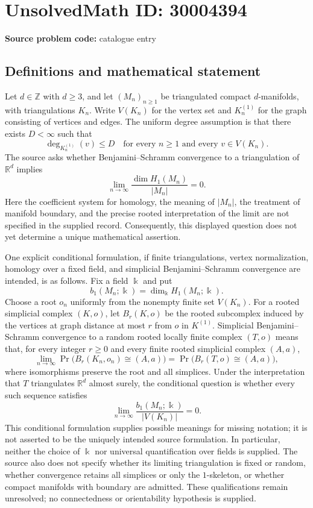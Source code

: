 \documentclass[11pt]{article}
\newcommand{\Z}{\mathbb{Z}}
\newcommand{\R}{\mathbb{R}}
\begin{document}
\section*{UnsolvedMath ID: 30004394}
\textbf{Source problem code:} catalogue entry
\subsection{Definitions and mathematical statement}
Let \(d\in\Z\) with \(d\geq3\), and let \((M_n)_{n\geq1}\) be triangulated compact \(d\)-manifolds, with triangulations \(K_n\). Write \(V(K_n)\) for the vertex set and \(K_n^{(1)}\) for the graph consisting of vertices and edges. The uniform degree assumption is that there exists \(D<\infty\) such that
\[
\deg_{K_n^{(1)}}(v)\leq D
\quad\text{for every }n\geq1\text{ and every }v\in V(K_n).
\]
The source asks whether Benjamini--Schramm convergence to a triangulation of \(\R^d\) implies
\[
\lim_{n\to\infty}\frac{\dim H_1(M_n)}{|M_n|}=0.
\]
Here the coefficient system for homology, the meaning of \(|M_n|\), the treatment of manifold boundary, and the precise rooted interpretation of the limit are not specified in the supplied record. Consequently, this displayed question does not yet determine a unique mathematical assertion.

One explicit conditional formulation, if finite triangulations, vertex normalization, homology over a fixed field, and simplicial Benjamini--Schramm convergence are intended, is as follows. Fix a field \(\Bbbk\) and put
\[
 b_1(M_n;\Bbbk)=\dim_{\Bbbk}H_1(M_n;\Bbbk).
\]
Choose a root \(o_n\) uniformly from the nonempty finite set \(V(K_n)\). For a rooted simplicial complex \((K,o)\), let \(B_r(K,o)\) be the rooted subcomplex induced by the vertices at graph distance at most \(r\) from \(o\) in \(K^{(1)}\). Simplicial Benjamini--Schramm convergence to a random rooted locally finite complex \((T,o)\) means that, for every integer \(r\geq0\) and every finite rooted simplicial complex \((A,a)\),
\[
\lim_{n\to\infty}\Pr\bigl(B_r(K_n,o_n)\cong(A,a)\bigr)
=\Pr\bigl(B_r(T,o)\cong(A,a)\bigr),
\]
where isomorphisms preserve the root and all simplices. Under the interpretation that \(T\) triangulates \(\R^d\) almost surely, the conditional question is whether every such sequence satisfies
\[
\lim_{n\to\infty}\frac{b_1(M_n;\Bbbk)}{|V(K_n)|}=0.
\]
This conditional formulation supplies possible meanings for missing notation; it is not asserted to be the uniquely intended source formulation. In particular, neither the choice of \(\Bbbk\) nor universal quantification over fields is supplied. The source also does not specify whether its limiting triangulation is fixed or random, whether convergence retains all simplices or only the \(1\)-skeleton, or whether compact manifolds with boundary are admitted. These qualifications remain unresolved; no connectedness or orientability hypothesis is supplied.
\end{document}
